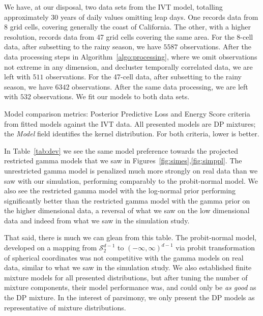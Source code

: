 We have, at our disposal, two data sets from the IVT model, totalling approximately 30 years of daily
  values omitting leap days.  One records data from 8 grid cells, covering
  generally the coast of California.  The other, with a higher resolution, records data from 47 grid
  cells covering the same area.  For the 8-cell data, after subsetting to the rainy season, we have
  $5587$ observations.  After the data processing steps in Algorithm~\ref{algo:processing}, where we
  omit observations not extreme in any dimension, and decluster temporally correlated data, we are left
  with $511$ observations.  For the 47-cell data, after subsetting to the rainy season, we have $6342$
  observations.  After the same data processing, we are left with
  $532$ observations.  We fit our models to both data sets.

\begin{table}[b]
  \centering
  \caption{Model comparison metrics: Posterior Predictive Loss and Energy Score criteria from fitted
    models against the IVT data.  All presented models are DP mixtures; the \emph{Model} field
    identifies the kernel distribution.  For both criteria, lower is better.
  \label{tab:dev}}
  
\end{table}

In Table~\ref{tab:dev} we see the same model preference towards the projected restricted gamma models
  that we saw in Figures~\ref{fig:simes},\ref{fig:simppl}.  The unrestricted gamma model is penalized much
  more strongly on real data than we saw with our simulation, performing comparably to the probit-normal
  model.  We also see the restricted gamma model with the log-normal prior performing significantly
  better than the restricted gamma model with the gamma prior on the higher dimensional data, a reversal
  of what we saw on the low dimensional data and indeed from what we saw in the simulation study.

That said, there is much we can glean from this table.  The probit-normal model, developed on a
  mapping from $\mathcal{S}_{2}^{d-1}$ to $(-\infty,\infty)^{d-1}$ via probit transformation of
  spherical coordinates was not competitive with the gamma models on real data, similar to what we
  saw in the simulation study. We also established finite mixture models for all presented
  distributions, but after tuning the number of mixture components, their model performance was,
  and could only be \emph{as good} as the DP mixture.  In the interest of parsimony, we only present
  the DP models as representative of mixture distributions.

